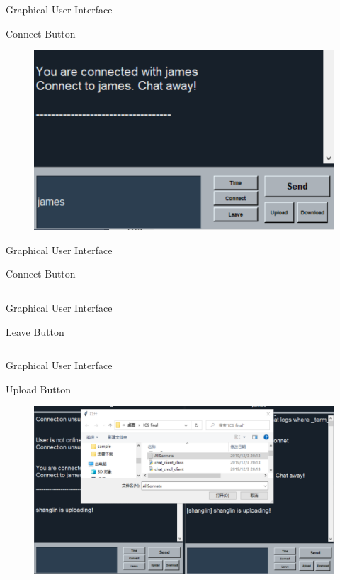 \documentclass[a4paper,10pt]{beamer}
\begin{document}
\begin{frame}{Graphical User Interface}
\begin{block}{Connect Button}
\begin{figure}
    \centering
    \includegraphics[width=0.7\linewidth]{connect2.png}
\end{figure}
\end{block}
\end{frame}

\begin{frame}{Graphical User Interface}
\begin{block}{Connect Button}
\inputminted[linenos]{python}{connect.py}
\end{block}
\end{frame}


\begin{frame}{Graphical User Interface}
\begin{block}{Leave Button}
\inputminted[linenos]{python}{quit.py}
\end{block}
\end{frame}

\begin{frame}{Graphical User Interface}
\begin{block}{Upload Button}
\begin{figure}
    \centering
    \includegraphics[width=\linewidth]{upload.png}
\end{figure}
\end{block}
\end{frame}
\end{document}
